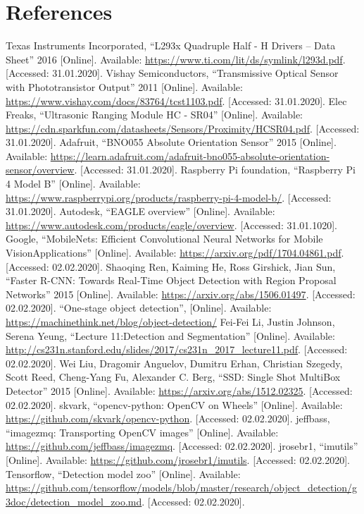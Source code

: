 \newpage

\section{References}
\begin{flushleft}
\begin{thebibliography}{99}
 Texas Instruments Incorporated, ``L293x Quadruple Half - H Drivers -- Data Sheet'' 2016 [Online]. Available: \url{https://www.ti.com/lit/ds/symlink/l293d.pdf}. [Accessed: 31.01.2020].
 Vishay Semiconductors, ``Transmissive Optical Sensor with Phototransistor Output'' 2011 [Online]. Available: \url{https://www.vishay.com/docs/83764/tcst1103.pdf}. [Accessed: 31.01.2020].
 Elec Freaks, ``Ultrasonic Ranging Module HC - SR04'' [Online]. Available: \url{https://cdn.sparkfun.com/datasheets/Sensors/Proximity/HCSR04.pdf}. [Accessed: 31.01.2020].
 Adafruit, ``BNO055 Absolute Orientation Sensor'' 2015 [Online]. Available: \url{https://learn.adafruit.com/adafruit-bno055-absolute-orientation-sensor/overview}. [Accessed: 31.01.2020].
 Raspberry Pi foundation, ``Raspberry Pi 4 Model B'' [Online]. Available: \url{https://www.raspberrypi.org/products/raspberry-pi-4-model-b/}. [Accessed: 31.01.2020].
 Autodesk, ``EAGLE overview'' [Online]. Available: \url{https://www.autodesk.com/products/eagle/overview}. [Accessed: 31.01.1020]. 
 Google, ``MobileNets: Efficient Convolutional Neural Networks for Mobile VisionApplications'' [Online]. Available: \url{https://arxiv.org/pdf/1704.04861.pdf}. [Accessed: 02.02.2020].
 Shaoqing Ren, Kaiming He, Ross Girshick, Jian Sun, ``Faster R-CNN: Towards Real-Time Object Detection with Region Proposal Networks'' 2015 [Online]. Available: \url{https://arxiv.org/abs/1506.01497}. [Accessed: 02.02.2020].
 ``One-stage object detection'', [Online]. Available: \url{https://machinethink.net/blog/object-detection/}
 Fei-Fei Li, Justin Johnson, Serena Yeung, ``Lecture 11:Detection and Segmentation'' [Online]. Available: \url{http://cs231n.stanford.edu/slides/2017/cs231n_2017_lecture11.pdf}. [Accessed: 02.02.2020].
 Wei Liu, Dragomir Anguelov, Dumitru Erhan, Christian Szegedy, Scott Reed, Cheng-Yang Fu, Alexander C. Berg, ``SSD: Single Shot MultiBox Detector'' 2015 [Online]. Available: \url{https://arxiv.org/abs/1512.02325}. [Accessed: 02.02.2020].
 skvark, ``opencv-python: OpenCV on Wheels'' [Online]. Available: \url{https://github.com/skvark/opencv-python}. [Accessed: 02.02.2020].
 jeffbass, ``imagezmq: Transporting OpenCV images'' [Online]. Available: \url{https://github.com/jeffbass/imagezmq}. [Accessed: 02.02.2020].
 jrosebr1, ``imutils'' [Online]. Available: \url{https://github.com/jrosebr1/imutils}. [Accessed: 02.02.2020].
 Tensorflow, ``Detection model zoo'' [Online]. Available: \url{https://github.com/tensorflow/models/blob/master/research/object_detection/g3doc/detection_model_zoo.md}. [Accessed: 02.02.2020].
\end{thebibliography} 

\end{flushleft}

